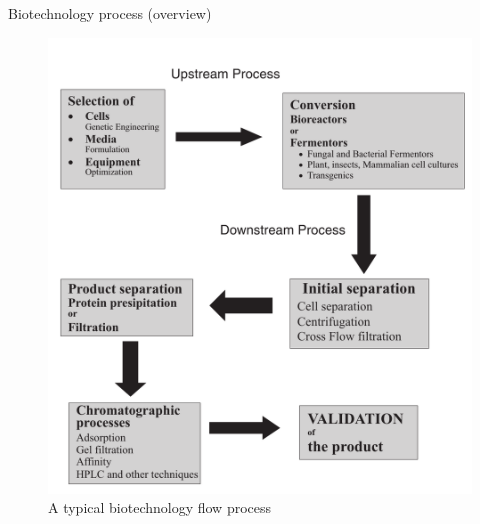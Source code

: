 \documentclass[
  ignorenonframetext,
  aspectratio=169]{beamer}
\begin{document}
\begin{frame}{Biotechnology process (overview)}
\protect\hypertarget{biotechnology-process-overview}{}
\begin{figure}
\includegraphics[width=0.4\linewidth]{../images/bioprocess_flow_chart} \caption{A typical biotechnology flow process}\label{fig:biotechnology-process}
\end{figure}
\end{frame}
\end{document}
